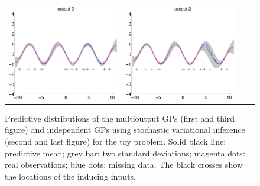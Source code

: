 \begin{figure}
\begin{tabular}{cccc}
\includegraphics[scale=0.2]{figures/toy-slfm-y2.eps} &
\includegraphics[scale=0.2]{figures/toy-svigp-y2.eps}
\end{tabular}
\caption{Predictive distributions of the multioutput GPs (first and third figure) and independent GPs using stochastic variational inference (second and last figure) for the  toy problem. Solid black line: predictive mean; grey bar: two standard deviations; magenta dots: real observations; blue dots: missing data. The black crosses show the locations of the inducing inputs.}
\label{fig:toy}
\end{figure}

